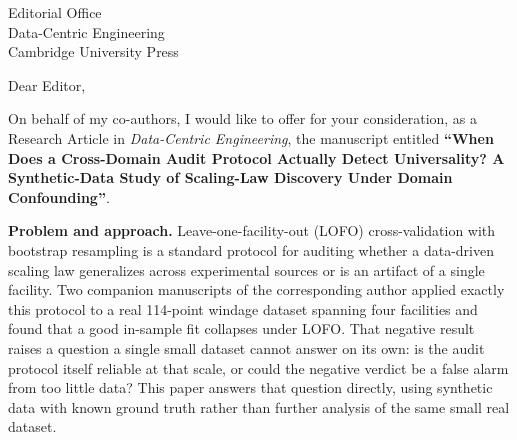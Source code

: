 \documentclass[12pt,a4paper]{letter}
\date{\today}
\begin{document}
\begin{letter}{Editorial Office\\Data-Centric Engineering\\Cambridge University Press}

\opening{Dear Editor,}

On behalf of my co-authors, I would like to offer for your consideration, as a Research Article in \textit{Data-Centric Engineering}, the manuscript entitled \textbf{``When Does a Cross-Domain Audit Protocol Actually Detect Universality? A Synthetic-Data Study of Scaling-Law Discovery Under Domain Confounding''}.

\textbf{Problem and approach.} Leave-one-facility-out (LOFO) cross-validation with bootstrap resampling is a standard protocol for auditing whether a data-driven scaling law generalizes across experimental sources or is an artifact of a single facility. Two companion manuscripts of the corresponding author applied exactly this protocol to a real 114-point windage dataset spanning four facilities and found that a good in-sample fit collapses under LOFO. That negative result raises a question a single small dataset cannot answer on its own: is the audit protocol itself reliable at that scale, or could the negative verdict be a false alarm from too little data? This paper answers that question directly, using synthetic data with known ground truth rather than further analysis of the same small real dataset.


\end{letter}
\end{document}
